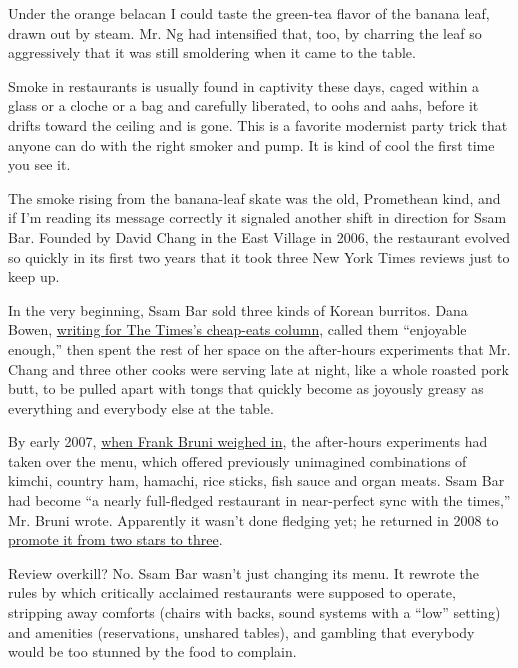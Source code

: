 Under the orange belacan I could taste the green-tea flavor of the
banana leaf, drawn out by steam. Mr. Ng had intensified that, too, by
charring the leaf so aggressively that it was still smoldering when it
came to the table.

Smoke in restaurants is usually found in captivity these days, caged
within a glass or a cloche or a bag and carefully liberated, to oohs and
aahs, before it drifts toward the ceiling and is gone. This is a
favorite modernist party trick that anyone can do with the right smoker
and pump. It is kind of cool the first time you see it.

The smoke rising from the banana-leaf skate was the old, Promethean
kind, and if I'm reading its message correctly it signaled another shift
in direction for Ssam Bar. Founded by David Chang in the East Village in
2006, the restaurant evolved so quickly in its first two years that it
took three New York Times reviews just to keep up.

In the very beginning, Ssam Bar sold three kinds of Korean burritos.
Dana Bowen,
\href{http://www.nytimes3xbfgragh.onion/2006/10/25/dining/reviews/25unde.html}{writing
for The Times's cheap-eats column,} called them ``enjoyable enough,''
then spent the rest of her space on the after-hours experiments that Mr.
Chang and three other cooks were serving late at night, like a whole
roasted pork butt, to be pulled apart with tongs that quickly become as
joyously greasy as everything and everybody else at the table.

By early 2007,
\href{http://www.nytimes3xbfgragh.onion/2007/02/21/dining/reviews/21rest.html}{when
Frank Bruni weighed in}, the after-hours experiments had taken over the
menu, which offered previously unimagined combinations of kimchi,
country ham, hamachi, rice sticks, fish sauce and organ meats. Ssam Bar
had become ``a nearly full-fledged restaurant in near-perfect sync with
the times,'' Mr. Bruni wrote. Apparently it wasn't done fledging yet; he
returned in 2008 to
\href{http://www.nytimes3xbfgragh.onion/2008/12/03/dining/reviews/03rest.html}{promote
it from two stars to three}.

Review overkill? No. Ssam Bar wasn't just changing its menu. It rewrote
the rules by which critically acclaimed restaurants were supposed to
operate, stripping away comforts (chairs with backs, sound systems with
a ``low'' setting) and amenities (reservations, unshared tables), and
gambling that everybody would be too stunned by the food to complain.

